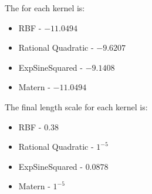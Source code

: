 \begin{solution}
    The  for each kernel is:

    \begin{itemize}
        \item { RBF - $-11.0494$ }
        \item { Rational Quadratic - $-9.6207$ }
        \item { ExpSineSquared - $-9.1408$ }
        \item { Matern - $-11.0494$ }
    \end{itemize}

    The final length scale for each kernel is:

    \begin{itemize}
        \item { RBF - $0.38$ }
        \item { Rational Quadratic - $1^{-5}$ }
        \item { ExpSineSquared - $0.0878$ }
        \item { Matern - $1^{-5}$ }
    \end{itemize}

\end{solution}